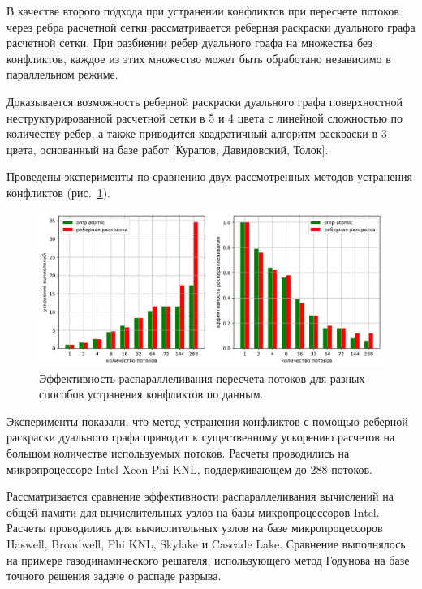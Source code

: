 \documentclass[a4paper,14pt]{extarticle}                     %
\theoremstyle{plain}                                         %
\begin{document}
В качестве второго подхода при устранении конфликтов при пересчете потоков через ребра расчетной сетки рассматривается реберная раскраски дуального графа расчетной сетки.
При разбиении ребер дуального графа на множества без конфликтов, каждое из этих множество может быть обработано независимо в параллельном режиме.

Доказывается возможность реберной раскраски дуального графа поверхностной неструктурированной расчетной сетки в 5 и 4 цвета с линейной сложностью по количеству ребер, а также приводится квадратичный алгоритм раскраски в 3 цвета, основанный на базе работ [Курапов, Давидовский, Толок].

Проведены эксперименты по сравнению двух рассмотренных методов устранения конфликтов (рис.~\ref{fig:text_3_edge_coloring_11}).

\begin{figure}[ht]
\centering
\includegraphics[width=1.0\textwidth]{./pics/text_3_edge_coloring/11-chart.png}
\singlespacing
\caption{Эффективность распараллеливания пересчета потоков для разных способов устранения конфликтов по данным.}
\label{fig:text_3_edge_coloring_11}
\end{figure}

Эксперименты показали, что метод устранения конфликтов с помощью реберной раскраски дуального графа приводит к существенному ускорению расчетов на большом количестве используемых потоков.
Расчеты проводились на микропроцессоре Intel Xeon Phi KNL, поддерживающем до 288 потоков.

Рассматривается сравнение эффективности распараллеливания вычислений на общей памяти для вычислительных узлов на базы микропроцессоров Intel.
Расчеты проводились для вычислительных узлов на базе микропроцессоров Haswell, Broadwell, Phi KNL, Skylake и Cascade Lake.
Сравнение выполнялось на примере газодинамического решателя, использующего метод Годунова на базе точного решения задаче о распаде разрыва.
\end{document}
